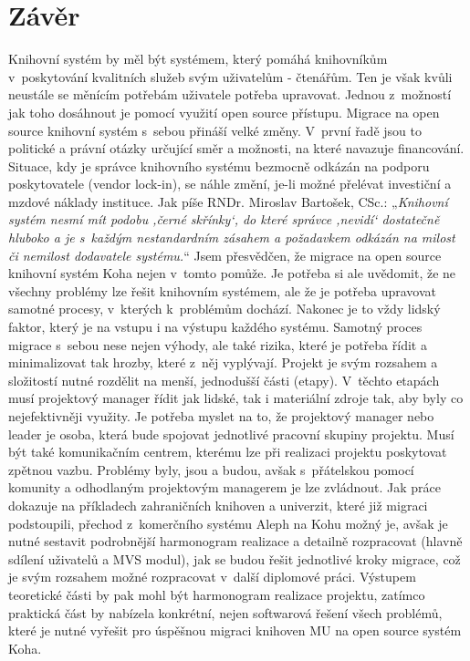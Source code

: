 \documentclass[
	11pt, oneside, printed, draft, 
	table,   %
	lof,     %
	lot     %
]{fithesis3}
\makeatletter
\newcommand{\citace}[1]{„\textit{#1}“} %
\makeatother
\begin{document}
{\chapter*{Závěr}
Knihovní systém by měl být systémem, který pomáhá knihovníkům v~poskytování kvalitních služeb svým uživatelům - čtenářům. Ten je však kvůli neustále se měnícím potřebám uživatele potřeba upravovat. Jednou z~možností jak toho dosáhnout je pomocí využití open source přístupu. Migrace na open source knihovní systém s~sebou přináší velké změny. V~první řadě jsou to politické a právní otázky určující směr a možnosti, na které navazuje financování. Situace, kdy je správce knihovního systému bezmocně odkázán na podporu poskytovatele (vendor lock-in), se náhle změní, je-li možné přelévat investiční a mzdové náklady instituce. Jak píše RNDr. Miroslav Bartošek, CSc.: \citace{Knihovní systém nesmí mít podobu ‚černé skřínky‘, do které správce ‚nevidí‘ dostatečně hluboko a je s~každým nestandardním zásahem a požadavkem odkázán na milost či nemilost dodavatele systému.}%
 Jsem přesvědčen, že migrace na open source knihovní systém Koha nejen v~tomto pomůže. Je potřeba si ale uvědomit, že ne všechny problémy lze řešit knihovním systémem, ale že je potřeba upravovat samotné procesy, v~kterých k~problémům dochází. Nakonec je to vždy lidský faktor, který je na vstupu i na výstupu každého systému. Samotný proces migrace s~sebou nese nejen výhody, ale také rizika, které je potřeba řídit a minimalizovat tak hrozby, které z~něj vyplývají. Projekt je svým rozsahem a složitostí nutné rozdělit na menší, jednodušší části (etapy). V~těchto etapách musí projektový manager řídit jak lidské, tak i materiální zdroje tak, aby byly co nejefektivněji využity. Je potřeba myslet na to, že projektový manager nebo leader je osoba, která bude spojovat jednotlivé pracovní skupiny projektu. Musí být také komunikačním centrem, kterému lze při realizaci projektu poskytovat zpětnou vazbu.  Problémy byly, jsou a budou, avšak s~přátelskou pomocí komunity a odhodlaným projektovým managerem je lze zvládnout. Jak práce dokazuje na příkladech zahraničních knihoven a univerzit, které již migraci podstoupili, přechod z~komerčního systému Aleph na Kohu možný je, avšak je nutné sestavit podrobnější harmonogram realizace a detailně rozpracovat (hlavně sdílení uživatelů a MVS modul), jak se budou řešit jednotlivé kroky migrace, což je svým rozsahem možné rozpracovat v~další diplomové práci. Výstupem teoretické části by pak mohl být harmonogram realizace projektu, zatímco praktická část by nabízela konkrétní, nejen softwarová řešení všech problémů, které je nutné vyřešit pro úspěšnou migraci knihoven MU na open source systém Koha.

}
\end{document}
